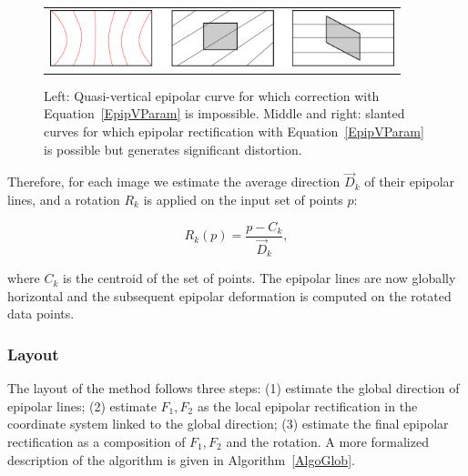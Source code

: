 \documentclass{ipol}
\begin{document}
\begin{figure}
\centering
\begin{tabular}{c}
\includegraphics[width=10cm]{FIGS/EpipReqOrient.png}
\end{tabular}
\caption{Left: Quasi-vertical epipolar curve for which correction with Equation~\eqref{EpipVParam} is impossible.  Middle and right: slanted curves for which epipolar rectification  with Equation~\eqref{EpipVParam} is possible
         but generates significant distortion.}
\label{ReqOrient}
\end{figure}

Therefore, for each image we estimate the average direction $\vec{D}_k$
of their epipolar lines, and a rotation $R_k$ is applied on the  input set of points $p$:

\begin{equation}
    R_k(p) =  \frac{p-C_k}{\vec{D}_k},  \label{EqRot}
\end{equation}

where $C_k$ is the centroid of the set of points. The epipolar lines are now globally horizontal and the subsequent epipolar deformation is computed on the rotated data points. 



\subsubsection{Layout}

The layout of the method follows three steps: (1) estimate the global 
direction of epipolar lines; (2) estimate $F_1,F_2$ as  the local epipolar rectification
 in the coordinate system linked to the global direction; (3)  estimate the final
epipolar rectification as a composition of $F_1,F_2$ and the rotation.
A more formalized description of the algorithm is given in Algorithm~\ref{AlgoGlob}.
\end{document}
